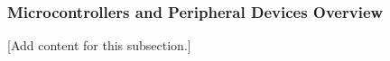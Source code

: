
\subsubsection{Microcontrollers and Peripheral Devices Overview}
\label{subsubsec:design_2_3_microcontrollers_peripherals_overview}

[Add content for this subsection.]
